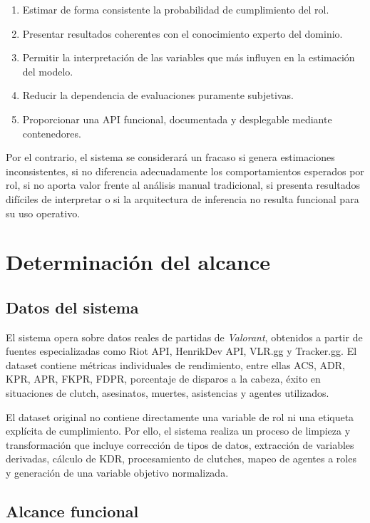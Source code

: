 \documentclass{ULBreport} %
\begin{document}
\begin{enumerate}
    \item Estimar de forma consistente la probabilidad de cumplimiento del rol.
    \item Presentar resultados coherentes con el conocimiento experto del dominio.
    \item Permitir la interpretación de las variables que más influyen en la estimación del modelo.
    \item Reducir la dependencia de evaluaciones puramente subjetivas.
    \item Proporcionar una API funcional, documentada y desplegable mediante contenedores.
\end{enumerate}

Por el contrario, el sistema se considerará un fracaso si genera estimaciones inconsistentes, si no diferencia adecuadamente los comportamientos esperados por rol, si no aporta valor frente al análisis manual tradicional, si presenta resultados difíciles de interpretar o si la arquitectura de inferencia no resulta funcional para su uso operativo.

\section{Determinación del alcance}

\subsection{Datos del sistema}

El sistema opera sobre datos reales de partidas de \textit{Valorant}, obtenidos a partir de fuentes especializadas como Riot API, HenrikDev API, VLR.gg y Tracker.gg. El dataset contiene métricas individuales de rendimiento, entre ellas ACS, ADR, KPR, APR, FKPR, FDPR, porcentaje de disparos a la cabeza, éxito en situaciones de clutch, asesinatos, muertes, asistencias y agentes utilizados.

El dataset original no contiene directamente una variable de rol ni una etiqueta explícita de cumplimiento. Por ello, el sistema realiza un proceso de limpieza y transformación que incluye corrección de tipos de datos, extracción de variables derivadas, cálculo de KDR, procesamiento de clutches, mapeo de agentes a roles y generación de una variable objetivo normalizada.

\subsection{Alcance funcional}
\end{document}
